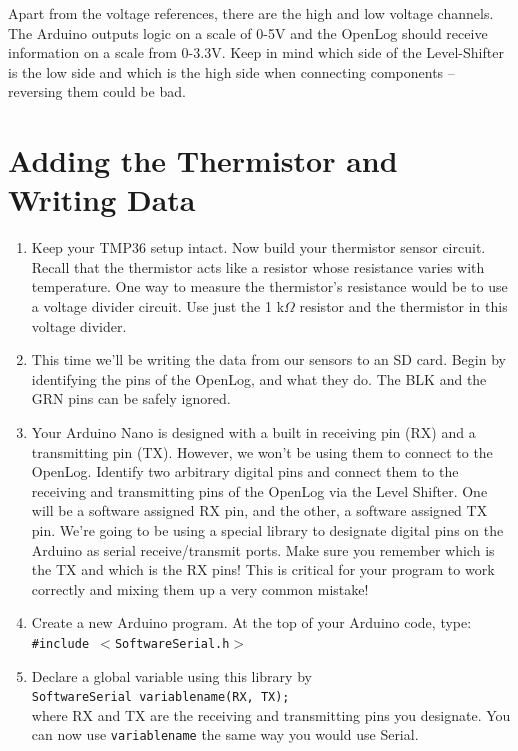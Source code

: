 \documentclass[12pt]{article}
\begin{document}
	Apart from the voltage references, there are the high and low voltage channels. The Arduino outputs logic on a scale of 0-5V and the OpenLog should receive information on a scale from 0-3.3V. Keep in mind which side of the Level-Shifter is the low side and which is the high side when connecting components -- reversing them could be bad.
    
	\newpage
	
	\section{Adding the Thermistor and Writing Data}
	\begin{enumerate}
		\item Keep your TMP36 setup intact. Now build your thermistor sensor circuit. Recall that the thermistor acts like a resistor whose resistance varies with temperature. One way to measure the thermistor's resistance would be to use a voltage divider circuit. Use just the 1 k$\Omega$ resistor and the thermistor in this voltage divider.
		
		\item This time we'll be writing the data from our sensors to an SD card. Begin by identifying the pins of the OpenLog, and what they do. The BLK and the GRN pins can be safely ignored.
	
		\item Your Arduino Nano is designed with a built in receiving pin (RX) and a transmitting pin (TX). However, we won't be using them to connect to the OpenLog. Identify two arbitrary digital pins and connect them to the receiving and transmitting pins of the OpenLog via the Level Shifter. One will be a software assigned RX pin, and the other, a software assigned TX pin. We're going to be using a special library to designate digital pins on the Arduino as serial receive/transmit ports. Make sure you remember which is the TX and which is the RX pins! This is critical for your program to work correctly and mixing them up a very common mistake!
		
		\item Create a new Arduino program. At the top of your Arduino code, type: \\ \texttt{\#include $<$SoftwareSerial.h$>$}
		
		\item Declare a global variable using this library by \\ \texttt{SoftwareSerial variablename(RX, TX);} \\ where RX and TX are the receiving and transmitting pins you designate. You can now use \texttt{variablename} the same way you would use Serial.
		

\end{enumerate}
\end{document}
